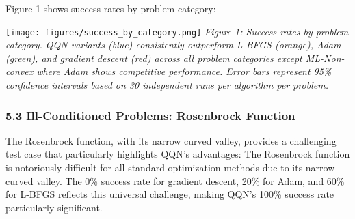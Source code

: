 Figure 1 shows success rates by problem category:

\texttt{[image: figures/success\_by\_category.png]}
\emph{Figure 1: Success rates by problem category. QQN variants (blue) consistently outperform L-BFGS (orange), Adam (green), and gradient descent (red) across all problem categories except ML-Non-convex where Adam shows competitive performance. Error bars represent 95\% confidence intervals based on 30 independent runs per algorithm per problem.}

\hypertarget{ill-conditioned-problems-rosenbrock-function}{%
\subsubsection{5.3 Ill-Conditioned Problems: Rosenbrock Function}\label{ill-conditioned-problems-rosenbrock-function}}

The Rosenbrock function, with its narrow curved valley, provides a challenging test case that particularly highlights
QQN's advantages:
The Rosenbrock function is notoriously difficult for all standard optimization methods due to its narrow curved valley.
The 0\% success rate for gradient descent, 20\% for Adam, and 60\% for L-BFGS reflects this universal challenge, making
QQN's 100\% success rate particularly significant.


